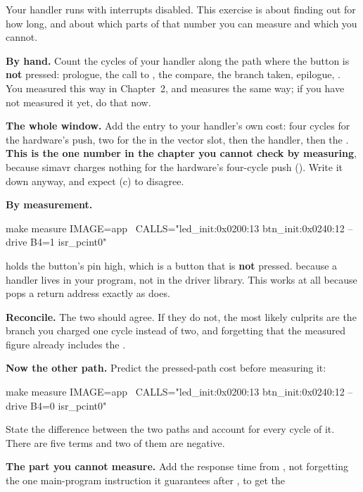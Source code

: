 Your handler runs with interrupts disabled. This exercise is about finding out for how long, and
about which parts of that number you can measure and which you cannot.
\begin{parts}
  \item \textbf{By hand.} Count the cycles of your handler along the path where the button is
    \textbf{not} pressed: prologue, the call to , the compare, the branch taken,
    epilogue, . You measured  this way in Chapter~2, and
     measures the same way; if you have not measured it yet, do that now.
  \item \textbf{The whole window.} Add the entry to your handler's own cost: four cycles for the
    hardware's push, two for the  in the vector slot, then the handler, then the
    . \textbf{This is the one number in the chapter you cannot check by measuring},
    because simavr charges nothing for the hardware's four-cycle push ().
    Write it down anyway, and expect (c) to disagree.
  \item \textbf{By measurement.}
\begin{shell}
make measure IMAGE=app \
    CALLS="led_init:0x0200:13 btn_init:0x0240:12 --drive B4=1 isr_pcint0"
\end{shell}
     holds the button's pin high, which is a button that is \textbf{not}
    pressed. \code{IMAGE=app} because a handler lives in your program, not in the driver library.
    This works at all because \code{reti} pops a return address exactly as \code{ret} does.
  \item \textbf{Reconcile.} The two should agree. If they do not, the most likely culprits are the
    branch you charged one cycle instead of two, and forgetting that the measured figure already
    includes the \code{reti}.
  \item \textbf{Now the other path.} Predict the pressed-path cost before measuring it:
\begin{shell}
make measure IMAGE=app \
    CALLS="led_init:0x0200:13 btn_init:0x0240:12 --drive B4=0 isr_pcint0"
\end{shell}
    State the difference between the two paths and account for every cycle of it. There are five
    terms and two of them are negative.
  \item \textbf{The part you cannot measure.} Add the response time from \secref{c3:sec:sequence},
    not forgetting the one main-program instruction it guarantees after , to get the

\end{parts}
